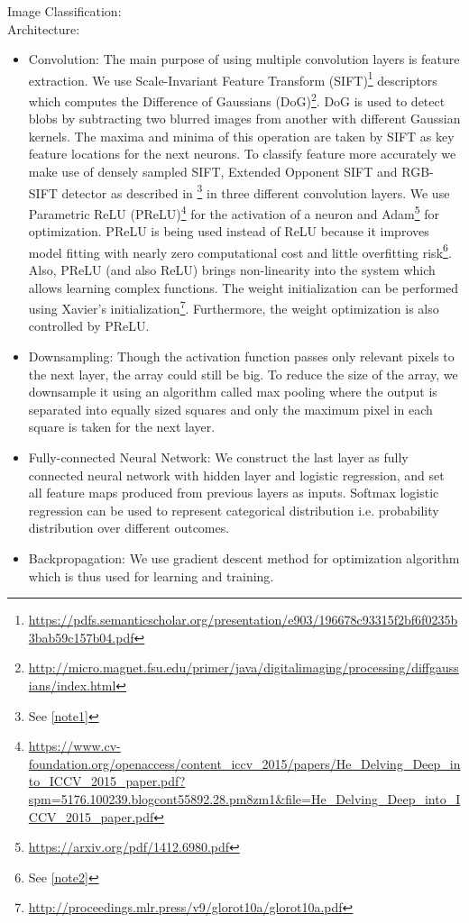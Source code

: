 \documentclass[8pt,a4]{article}
\begin{document}
\begin{itemize}
	Image Classification:
	\\Architecture:
	\begin{itemize}
		\item Convolution: The main purpose of using multiple convolution layers is feature extraction. We use Scale-Invariant Feature Transform (SIFT)\footnote{\url{https://pdfs.semanticscholar.org/presentation/e903/196678c93315f2bf6f0235b3bab59c157b04.pdf}} descriptors which computes the Difference of Gaussians (DoG)\footnote{\url{http://micro.magnet.fsu.edu/primer/java/digitalimaging/processing/diffgaussians/index.html}}. DoG is used to detect blobs by subtracting two blurred images from another with different Gaussian kernels. The maxima and minima of this operation are taken by SIFT as key feature locations for the next neurons. To classify feature more accurately we make use of densely sampled SIFT, Extended Opponent SIFT and RGB-SIFT detector as described in \footnote{See \ref{note1}
		} in three different convolution layers. We use Parametric ReLU (PReLU)\footnote{\url{https://www.cv-foundation.org/openaccess/content_iccv_2015/papers/He_Delving_Deep_into_ICCV_2015_paper.pdf?spm=5176.100239.blogcont55892.28.pm8zm1&file=He_Delving_Deep_into_ICCV_2015_paper.pdf}} for the activation of a neuron and Adam\footnote{\url{https://arxiv.org/pdf/1412.6980.pdf}} for optimization. PReLU is being used instead of ReLU because it improves model fitting with nearly zero computational cost and little overfitting risk\footnote{See \ref{note2}}. Also, PReLU (and also ReLU) brings non-linearity into the system which allows learning complex functions. The weight initialization can be performed using Xavier's initialization\footnote{\url{http://proceedings.mlr.press/v9/glorot10a/glorot10a.pdf}}. Furthermore, the weight optimization is also controlled by PReLU.
		\item Downsampling:  Though the activation function passes only relevant pixels to the next layer, the array could still be big. To reduce the size of the array, we downsample it using an algorithm called max pooling where the output is separated into equally sized squares and only the maximum pixel in each square is taken for the next layer.
		\item Fully-connected Neural Network: We construct the last layer as fully connected neural network with hidden layer and logistic regression, and set all feature maps produced from previous layers as inputs. Softmax logistic regression can be used to represent categorical distribution i.e. probability distribution over different outcomes.
		\item Backpropagation: We use gradient descent method for optimization algorithm which is thus used for learning and training.
	\end{itemize}
	

\end{itemize}
\end{document}
